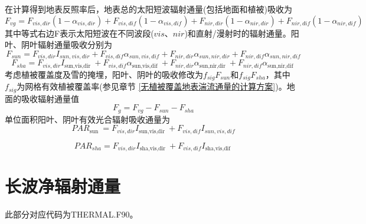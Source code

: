 在计算得到地表反照率后，地表总的太阳短波辐射通量(包括地面和植被)吸收为
\begin{equation}
F_{v g}=F_{vis,dir}\left(1-\alpha_{vis,dir}\right)+F_{vis,dif}\left(1-\alpha_{vis,dif}\right)+
F_{nir,dir}\left(1-\alpha_{nir,dir}\right)+F_{nir,dif}\left(1-\alpha_{nir,dif}\right)
\end{equation}
其中等式右边F表示太阳短波在不同波段($vis$、$nir$)和直射/漫射时的辐射通量。阳叶、阴叶辐射通量吸收分别为
\begin{equation}
F_{s u n}=F_{vi s, dir} I_{s u n, vi s, dir}+F_{vis, dif} \alpha_{s u n, vis, dif}+F_{ni r, dir} \alpha_{s u n, ni r, dir}+F_{nir, dif} \alpha_{s u n, nir, dif}
\end{equation}
\begin{equation}
F_{s h a}=F_{vi s, dir} I_{\text {sun,vis,dir }}+F_{vis, dif} \alpha_{\text {sun,vis,dif }}+F_{ni r, dir} \alpha_{\text {sun,nir,dir }}+F_{nir, dif} \alpha_{\text {sun,nir,dif }}
\end{equation}
考虑植被覆盖度及雪的掩埋，阳叶、阴叶的吸收修改为$f_{sig}F_{sun}$和$f_{sig}F_{sha}$，其中$f_{sig}$为网格有效植被覆盖率(参见章节 \ref{无植被覆盖地表湍流通量的计算方案})。地面的吸收辐射通量值
\begin{equation}
F_{g}=F_{v g}-F_{s u n}-F_{s h a}
\end{equation}
单位面积阳叶、阴叶有效光合辐射吸收通量为
\begin{equation}
P A R_{\text {sun }}=F_{vi s, dir} I_{\text {sun,vis,dir }}+F_{vis, dif} I_{s u n, vis, dif}
\end{equation}

\begin{equation}
P A R_{s h a}=F_{vi s, dir} I_{\text {sha,vis,dir }}+F_{vis, dif} I_{\text {sha,vis,dif }}
\end{equation}


\section{长波净辐射通量}\label{长波净辐射通量}
此部分对应代码为THERMAL.F90。

